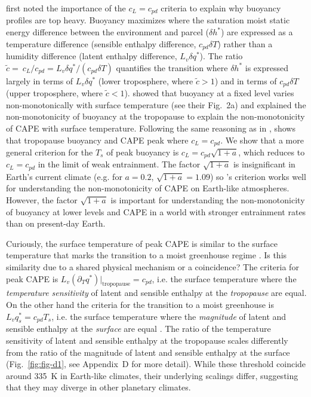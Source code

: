 \documentclass[draft,twocol]{ametsocV6.1}
\begin{document}
\cite{seeley2016} first noted the importance of the $c_L=c_{pd}$ criteria to explain why buoyancy profiles are top heavy. Buoyancy maximizes where the saturation moist static energy difference between the environment and parcel ($\delta h^*$) are expressed as a temperature difference (sensible enthalpy difference, $c_{pd}\delta T$) rather than a humidity difference (latent enthalpy difference, $L_v\delta q^*$). The ratio $\tilde{c}= \ c_L / c_{pd} = L_v \delta q^* / (c_{pd} \delta T)$ quantifies the transition where $\delta h^*$ is expressed largely in terms of $L_v \delta q^*$ (lower troposphere, where $\tilde{c}>1$) and in terms of $c_{pd}\delta T$ (upper troposphere, where $\tilde{c}<1$). \cite{seeley2015a} showed that buoyancy at a fixed level varies non-monotonically with surface temperature (see their Fig.~2a) and \cite{romps2016} explained the non-monotonicity of buoyancy at the tropopause to explain the non-monotonicity of CAPE with surface temperature. Following the same reasoning as in \cite{seeley2016}, \cite{romps2016} shows that tropopause buoyancy and CAPE peak where $c_L = c_{pd}$. We show that a more general criterion for the $T_s$ of peak buoyancy is $c_L = c_{pd}\sqrt{1+a}$, which reduces to $c_L = c_{pd}$ in the limit of weak entrainment. The factor $\sqrt{1+a}$ is insignificant in Earth's current climate (e.g. for $a=0.2$, $\sqrt{1+a}=1.09$) so \cite{romps2016}'s criterion works well for understanding the non-monotonicity of CAPE on Earth-like atmospheres. However, the factor $\sqrt{1+a}$ is important for understanding the non-monotonicity of buoyancy at lower levels and CAPE in a world with stronger entrainment rates than on present-day Earth.

Curiously, the surface temperature of peak CAPE \citep[$\approx335$~K,][]{romps2016} is similar to the surface temperature that marks the transition to a moist greenhouse regime \citep[$\approx335$~K,][]{komabayasi1967, ingersoll1969, kasting1988}. Is this similarity due to a shared physical mechanism or a coincidence? The criteria for peak CAPE is $L_v(\partial_T q^*)|_\mathrm{tropopause}=c_{pd}$, i.e. the surface temperature where the \textit{temperature sensitivity} of latent and sensible enthalpy at the \textit{tropopause} are equal. On the other hand the criteria for the transition to a moist greenhouse is $L_vq_s^* = c_{pd}T_s$, i.e. the surface temperature where the \textit{magnitude} of latent and sensible enthalpy at the \textit{surface} are equal \citep{wordsworth2013}. The ratio of the temperature sensitivity of latent and sensible enthalpy at the tropopause scales differently from the ratio of the magnitude of latent and sensible enthalpy at the surface (Fig.~\ref{fig:fig-d1}, see Appendix~D for more detail). While these threshold coincide around 335~K in Earth-like climates, their underlying scalings differ, suggesting that they may diverge in other planetary climates.
\end{document}
